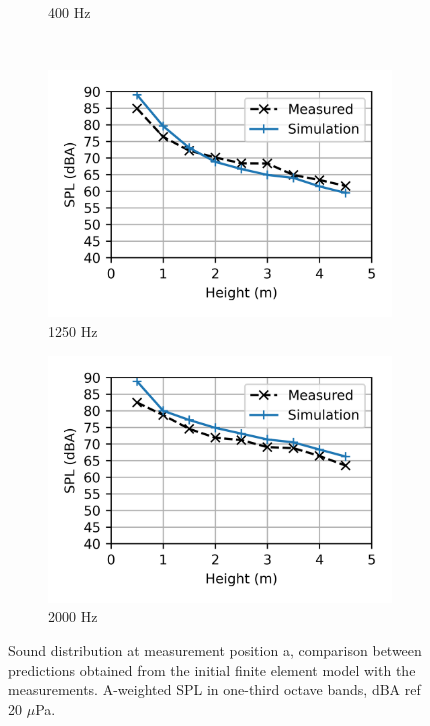 \begin{figure}[H]
\begin{subfigure}[b]{0.49\textwidth}
		\caption{400 Hz}
	\end{subfigure}
	\\
	\begin{subfigure}[b]{0.49\textwidth}
		\centering
		\includegraphics{fig/chap5/initial_model/third_octave_over_height/1250_Hz.png}
		\caption{1250 Hz}
	\end{subfigure}
	\hfill
	\begin{subfigure}[b]{0.49\textwidth}
		\centering
		\includegraphics{fig/chap5/initial_model/third_octave_over_height/2000_Hz.png}
		\caption{2000 Hz}
	\end{subfigure}
	\caption{Sound distribution at measurement position a, comparison between predictions obtained from the initial finite element model with the measurements. A-weighted SPL in one-third octave bands, dBA ref 20 $\mu$Pa.}
	\label{fig:third_octave_over_height}
\end{figure}

